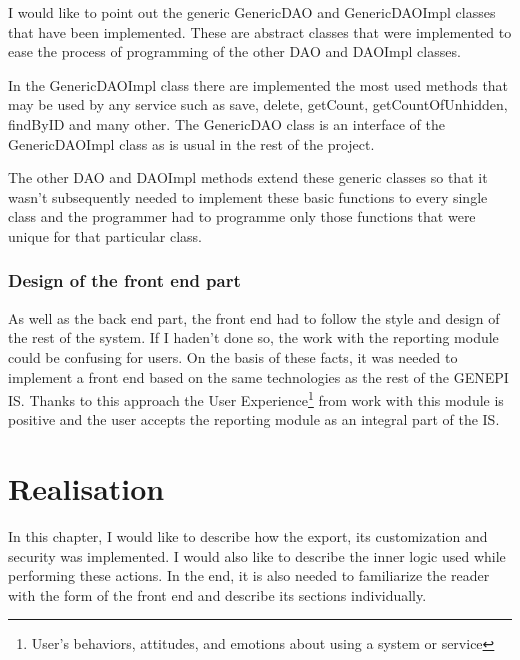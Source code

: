 \documentclass[thesis=B,english]{FITthesis}[2012/10/20]
\begin{document}
I would like to point out the generic GenericDAO and GenericDAOImpl classes that have been implemented.
These are abstract classes that were implemented to ease the process of programming of the other DAO and DAOImpl classes.

In the GenericDAOImpl class there are implemented the most used methods that may be used by any service such as save, delete, getCount, getCountOfUnhidden, findByID and many other. The GenericDAO class is an interface of the GenericDAOImpl class as is usual in the rest of the project. 

The other DAO and DAOImpl methods extend these generic classes so that it wasn't subsequently needed to implement these basic functions to every single class and the programmer had to programme only those functions that were unique for that particular class.

\subsection{Design of the front end part}
As well as the back end part, the front end had to follow the style and design of the rest of the system. If I haden't done so, the work with the reporting module could be confusing for users. On the basis of these facts, it was needed to implement a front end based on the same technologies as the rest of the GENEPI IS. Thanks to this approach the User Experience\footnote{User's behaviors, attitudes, and emotions about using a system or service} from work with this module is positive and the user accepts the reporting module as an integral part of the IS.

\chapter{Realisation}
In this chapter, I would like to describe how the export, its customization and security was implemented. I would also like to describe the inner logic used while performing these actions. In the end, it is also needed to familiarize the reader with the form of the front end and describe its sections individually.
\end{document}

